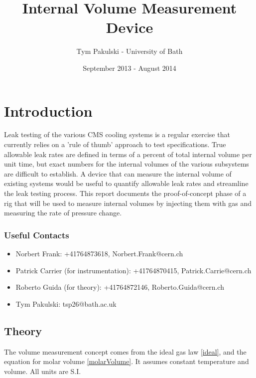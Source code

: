 \documentclass{report}
\author{Tym Pakulski - University of Bath}
\title{Internal Volume Measurement Device}
\date{September 2013 - August 2014}
\begin{document}
\graphicspath{{./images/}}
\maketitle
\tableofcontents
\section{Introduction}
Leak testing of the various CMS cooling systems is a regular exercise that currently relies on a 'rule of thumb' approach to test specifications. True allowable leak rates are defined in terms of a percent of total internal volume per unit time, but exact numbers for the internal volumes of the various subsystems are difficult to establish. A device that can measure the internal volume of existing systems would be useful to quantify allowable leak rates and streamline the leak testing process.
This report documents the proof-of-concept phase of a rig that will be used to measure internal volumes by injecting them with gas and measuring the rate of pressure change. 
\subsubsection{Useful Contacts}
\begin{itemize}
	\item{Norbert Frank: +41764873618, Norbert.Frank@cern.ch }
	\item{Patrick Carrier (for instrumentation): +41764870415, Patrick.Carrie@cern.ch}
	\item{Roberto Guida (for theory): +41764872146, Roberto.Guida@cern.ch}
	\item{Tym Pakulski: tsp26@bath.ac.uk}
\end{itemize}
\subsection{Theory}
The volume measurement concept comes from the ideal gas law \eqref{ideal}, and the equation for molar volume \eqref{molarVolume}. It assumes constant temperature and volume. All units are S.I.
\end{document}
